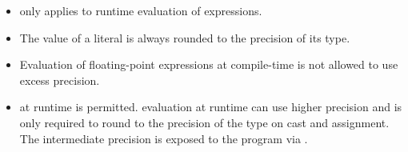\begin{itemize}
  \item {} only applies to runtime evaluation of \fp expressions.

  \item The value of a \fp literal is always rounded to the precision of its
    type.

  \item Evaluation of floating-point expressions at compile-time is not allowed
    to use excess precision.

  \item {} at runtime is permitted.
    \Fp evaluation at runtime can use higher precision and is only required to
    round to the precision of the \fp type on cast and assignment.
    The intermediate precision is exposed to the program via
    .
\end{itemize}
